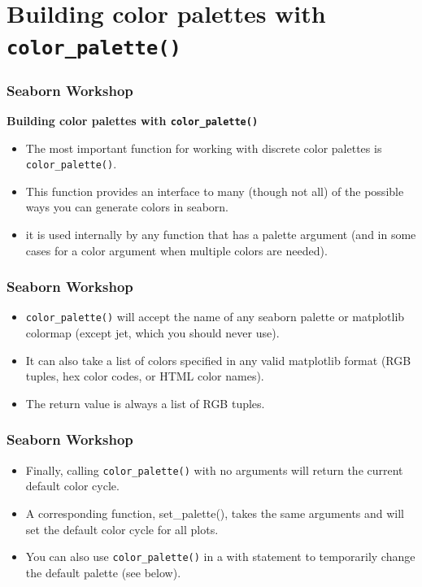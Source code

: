 \documentclass{beamer}
\begin{document}
\section{Building color palettes with \texttt{color\_palette()}}
\begin{frame}[fragile]
\frametitle{Seaborn Workshop}
\large

\textbf{Building color palettes with \texttt{color\_palette()}}\\
\begin{itemize}
\item The most important function for working with discrete color palettes is \texttt{color\_palette()}.
\item  This function provides an interface to many (though not all) of the possible ways you can generate colors in seaborn.
\item it is used internally by any function that has a palette argument (and in some cases for a color argument when multiple colors are needed).
\end{itemize}

\end{frame}
\begin{frame}[fragile]
	\frametitle{Seaborn Workshop}
	\large
	
\begin{itemize}
\item \texttt{color\_palette()} will accept the name of any seaborn palette or matplotlib colormap (except jet, which you should never use). 
\item It can also take a list of colors specified in any valid matplotlib format (RGB tuples, hex color codes, or HTML color names). \item The return value is always a list of RGB tuples.
\end{itemize}

\end{frame}
\begin{frame}[fragile]
\frametitle{Seaborn Workshop}
\large
\begin{itemize}
\item Finally, calling \texttt{color\_palette()} with no arguments will return the current default color cycle.

\item A corresponding function, set\_palette(), takes the same arguments and will set the default color cycle for all plots. 
\item You can also use \texttt{color\_palette()} in a with statement to temporarily change the default palette (see below).
\end{itemize}

\end{frame}
\end{document}
